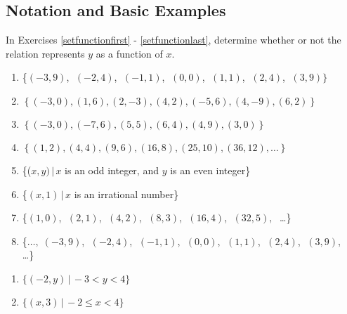 
\subsection{Notation and Basic Examples}                                

In Exercises \ref{setfunctionfirst} - \ref{setfunctionlast}, determine whether or not the relation represents $y$ as a function of $x$.  
\begin{enumerate}

\item \{$(-3, 9)$, $\;(-2, 4)$, $\;(-1, 1)$, $\;(0, 0)$, $\;(1, 1)$, $\;(2, 4)$, $\;(3, 9)\}$ \label{setfunctionfirst}
\item  $\left\{ (-3,0), (1,6), (2, -3), (4,2), (-5,6), (4, -9), (6,2) \right\}$
\item  $\left\{ (-3,0), (-7,6), (5,5), (6,4), (4,9), (3,0) \right\}$
\item  $\left\{ (1,2), (4,4), (9,6), (16,8), (25,10), (36, 12), \ldots \right\}$
\item \{($x, y) \, | \, x$ is an odd integer, and $y$ is an even integer\}
\item \{$(x, 1) \, | \, x$ is an irrational number\}
\item \{$(1, 0)$, $\;(2, 1)$, $\;(4, 2)$, $\;(8, 3)$, $\;(16, 4)$, $\;(32, 5), \;$ \ldots\}
\item \{$\ldots, \; (-3, 9)$, $\;(-2, 4)$, $\;(-1, 1)$, $\;(0, 0)$, $\;(1, 1)$, $\;(2, 4)$, $\;(3, 9), \;$ \ldots\}

\setcounter{HW}{\value{enumi}}

\end{enumerate}

\begin{multicols}{2}

\begin{enumerate}

\setcounter{enumi}{\value{HW}}

\item $\{ (-2, y) \, | \, -3 < y < 4\}$
\item  $\{ (x,3) \, | \,  -2 \leq x < 4\}$ \label{setfunctionlast}

\setcounter{HW}{\value{enumi}}
\end{enumerate}
\end{multicols}

